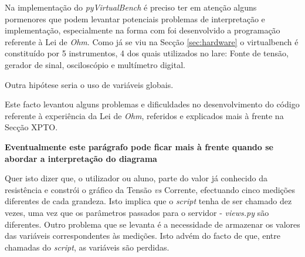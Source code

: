 




Na implementação do \textit{pyVirtualBench} é preciso ter em atenção alguns pormenores que podem levantar potenciais problemas de interpretação e implementação, especialmente na forma com foi desenvolvido a programação referente à Lei de \textit{Ohm}. Como já se viu na Secção \ref{sec:hardware} o \acrshort{virtualbench} é constituído por 5 instrumentos, 4 dos quais utilizados no \acrshort{lare}: Fonte de tensão, gerador de sinal, osciloscópio e multímetro digital.

Outra hipótese seria o uso de variáveis globais. 

Este facto levantou alguns problemas e dificuldades no desenvolvimento do código referente à experiência da Lei de \textit{Ohm}, referidos e explicados mais à frente na Secção XPTO.


\textbf{Eventualmente este parágrafo pode ficar mais à frente quando se abordar a interpretação do diagrama}

Quer isto dizer que, o utilizador ou aluno, parte do valor já conhecido da resistência e constrói o gráfico da Tensão \textit{vs} Corrente, efectuando cinco medições diferentes de cada grandeza. Isto implica que o \textit{script} tenha de ser chamado dez vezes, uma vez que os parâmetros passados para o servidor - \textit{views.py} são diferentes. Outro problema que se levanta é a necessidade de armazenar os valores das variáveis correspondentes às medições. Isto advém do facto de que, entre chamadas do \textit{script}, as variáveis são perdidas.

